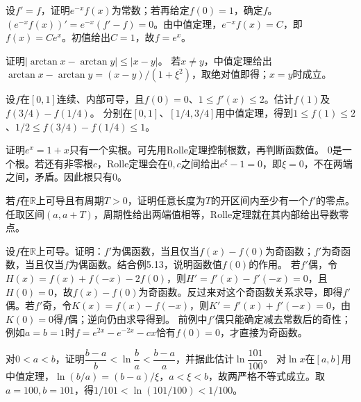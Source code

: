 设\(f'=f\)，证明\(e^{-x}f(x)\)为常数；若再给定\(f(0)=1\)，确定\(f\)。
\solutionanswer
\((e^{-x}f(x))'=e^{-x}(f'-f)=0\)。由中值定理，\(e^{-x}f(x)=C\)，即\(f(x)=Ce^x\)。初值给出\(C=1\)，故\(f=e^x\)。


证明\(|\arctan x-\arctan y|\le|x-y|\)。
\solutionanswer
若\(x\ne y\)，中值定理给出\(\arctan x-\arctan y=(x-y)/(1+\xi^2)\)，取绝对值即得；\(x=y\)时成立。


设\(f\)在\([0,1]\)连续、内部可导，且\(f(0)=0\)、\(1\le f'(x)\le2\)。估计\(f(1)\)及\(f(3/4)-f(1/4)\)。
\solutionanswer
分别在\([0,1]\)、\([1/4,3/4]\)用中值定理，得到\(1\le f(1)\le2\)、\(1/2\le f(3/4)-f(1/4)\le1\)。


证明\(e^x=1+x\)只有一个实根。可先用Rolle定理控制根数，再判断函数值。
\solutionanswer
\(0\)是一个根。若还有非零根\(c\)，Rolle定理会在\(0,c\)之间给出\(e^\xi-1=0\)，即\(\xi=0\)，不在两端之间，矛盾。因此根只有\(0\)。


若\(f\)在\(\mathbb R\)上可导且有周期\(T>0\)，证明任意长度为\(T\)的开区间内至少有一个\(f'\)的零点。
\solutionanswer
任取区间\((a,a+T)\)，周期性给出两端值相等，Rolle定理就在其内部给出导数零点。


设\(f\)在\(\mathbb R\)上可导。证明：\(f'\)为偶函数，当且仅当\(f(x)-f(0)\)为奇函数；\(f'\)为奇函数，当且仅当\(f\)为偶函数。结合例5.13，说明函数值\(f(0)\)的作用。
\solutionanswer
若\(f'\)偶，令\(H(x)=f(x)+f(-x)-2f(0)\)，则\(H'=f'(x)-f'(-x)=0\)，且\(H(0)=0\)，故\(f(x)-f(0)\)为奇函数。反过来对这个奇函数关系求导，即得\(f'\)偶。若\(f'\)奇，令\(K(x)=f(x)-f(-x)\)，则\(K'=f'(x)+f'(-x)=0\)，由\(K(0)=0\)得\(f\)偶；逆向仍由求导得到。
前例中\(f'\)偶只能确定减去常数后的奇性；例如\(a=b=1\)时\(f=e^{2x}-e^{-2x}-cx\)恰有\(f(0)=0\)，才直接为奇函数。


对\(0<a<b\)，证明\(\dfrac{b-a}{b}<\ln\dfrac ba<\dfrac{b-a}{a}\)，并据此估计\(\ln\dfrac{101}{100}\)。
\solutionanswer
对\(\ln x\)在\([a,b]\)用中值定理，\(\ln(b/a)=(b-a)/\xi\)，\(a<\xi<b\)，故两严格不等式成立。取\(a=100,b=101\)，得\(1/101<\ln(101/100)<1/100\)。


